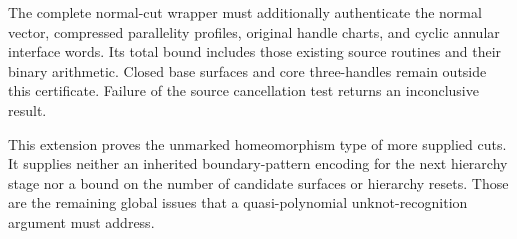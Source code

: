 The complete normal-cut wrapper must additionally authenticate the
normal vector, compressed parallelity profiles, original handle charts,
and cyclic annular interface words.  Its total bound includes those
existing source routines and their binary arithmetic.  Closed base
surfaces and core three-handles remain outside this certificate.
Failure of the source cancellation test returns an inconclusive result.

This extension proves the unmarked homeomorphism type of more supplied
cuts.  It supplies neither an inherited boundary-pattern encoding for
the next hierarchy stage nor a bound on the number of candidate
surfaces or hierarchy resets.  Those are the remaining global issues
that a quasi-polynomial unknot-recognition argument must address.
